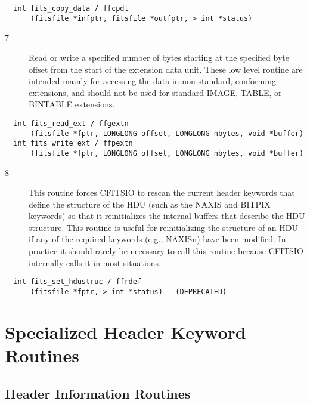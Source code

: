 \documentclass[11pt]{book}
\begin{document}
\begin{verbatim}
  int fits_copy_data / ffcpdt
      (fitsfile *infptr, fitsfile *outfptr, > int *status)
\end{verbatim}

\begin{description}
\item[7 ] Read or write a specified number of bytes starting at the specified byte
    offset from the start of the extension data unit.  These low
    level routine are intended mainly for accessing the data in
    non-standard, conforming extensions, and should not be used for standard
   IMAGE, TABLE, or BINTABLE extensions. \label{ffgextn}
\end{description}

\begin{verbatim}
  int fits_read_ext / ffgextn
      (fitsfile *fptr, LONGLONG offset, LONGLONG nbytes, void *buffer)
  int fits_write_ext / ffpextn
      (fitsfile *fptr, LONGLONG offset, LONGLONG nbytes, void *buffer)
\end{verbatim}

\begin{description}
\item[8 ] This routine forces CFITSIO to rescan the current header keywords that
    define the structure of the HDU (such as the NAXIS and BITPIX
    keywords) so that it reinitializes the internal buffers that
    describe the HDU structure.  This routine is useful for
    reinitializing the structure of an HDU if any of the required
    keywords (e.g., NAXISn) have been modified.  In practice it should
    rarely be necessary to call this routine because CFITSIO
   internally calls it in most situations. \label{ffrdef}
\end{description}

\begin{verbatim}
  int fits_set_hdustruc / ffrdef
      (fitsfile *fptr, > int *status)   (DEPRECATED)
\end{verbatim}

\section{Specialized Header Keyword Routines}


\subsection{Header Information Routines}
\end{document}
